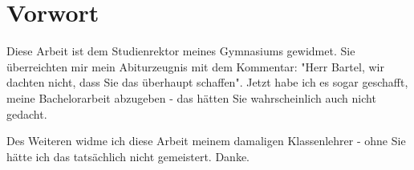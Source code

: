 \section*{Vorwort}

Diese Arbeit ist dem Studienrektor meines Gymnasiums gewidmet. Sie überreichten mir mein Abiturzeugnis mit dem Kommentar: "Herr Bartel, wir dachten nicht, dass Sie das überhaupt schaffen". Jetzt habe ich es sogar
geschafft, meine Bachelorarbeit abzugeben -  das hätten Sie wahrscheinlich auch nicht gedacht.

\smallskip

Des Weiteren widme ich diese Arbeit meinem damaligen Klassenlehrer - ohne Sie hätte ich das tatsächlich nicht gemeistert. Danke.



